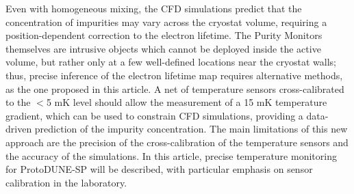Even with homogeneous mixing, the CFD simulations predict that the concentration of impurities may vary across the cryostat volume, requiring a position-dependent correction to the electron lifetime. The Purity Monitors themselves are intrusive objects which cannot be deployed inside the active volume, but rather only at a few well-defined locations near the cryostat walls; thus, precise inference of the electron lifetime map requires alternative methods, as the one proposed in this article. A net of temperature sensors cross-calibrated to the $<$5 mK level should allow the measurement of a 15 mK temperature gradient, which can be used to constrain CFD simulations, providing a data-driven prediction of the impurity concentration. The main limitations of this new approach are the precision of the cross-calibration of the temperature sensors and the accuracy of the simulations. In this article, precise temperature monitoring for
ProtoDUNE-SP will be described, with particular emphasis on sensor calibration in the laboratory.

